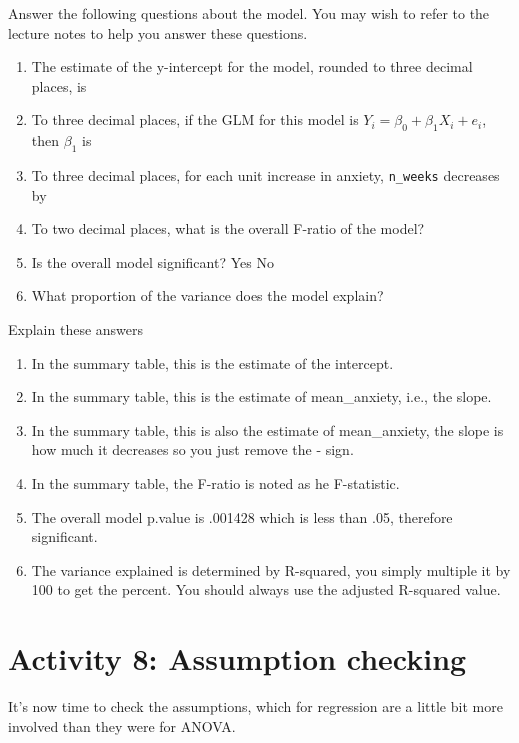 \documentclass[]{book}
\providecommand{\tightlist}{%
  \setlength{\itemsep}{0pt}\setlength{\parskip}{0pt}}
\begin{document}
Answer the following questions about the model. You may wish to refer to the lecture notes to help you answer these questions.

\begin{enumerate}
\def\labelenumi{\arabic{enumi}.}
\tightlist
\item
  The estimate of the y-intercept for the model, rounded to three decimal places, is 
\item
  To three decimal places, if the GLM for this model is \(Y_i = \beta_0 + \beta_1 X_i + e_i\), then \(\beta_1\) is 
\item
  To three decimal places, for each unit increase in anxiety, \texttt{n\_weeks} decreases by 
\item
  To two decimal places, what is the overall F-ratio of the model? 
\item
  Is the overall model significant? Yes No
\item
  What proportion of the variance does the model explain? 
\end{enumerate}

Explain these answers

\begin{enumerate}
\def\labelenumi{\arabic{enumi}.}
\tightlist
\item
  In the summary table, this is the estimate of the intercept.
\item
  In the summary table, this is the estimate of mean\_anxiety, i.e., the slope.
\item
  In the summary table, this is also the estimate of mean\_anxiety, the slope is how much it decreases so you just remove the - sign.
\item
  In the summary table, the F-ratio is noted as he F-statistic.
\item
  The overall model p.value is .001428 which is less than .05, therefore significant.
\item
  The variance explained is determined by R-squared, you simply multiple it by 100 to get the percent. You should always use the adjusted R-squared value.
\end{enumerate}

\hypertarget{activity-8-assumption-checking}{%
\section{Activity 8: Assumption checking}\label{activity-8-assumption-checking}}

It's now time to check the assumptions, which for regression are a little bit more involved than they were for ANOVA.
\end{document}
